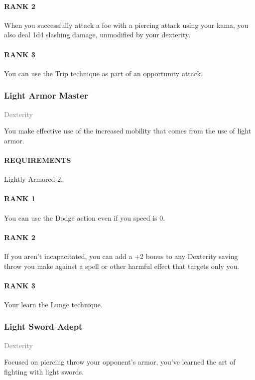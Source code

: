 \paragraph{RANK 2} When you successfully attack a foe with a piercing attack using your kama, you also deal 1d4 slashing damage, unmodified by your dexterity.
\paragraph{RANK 3} You can use the Trip technique as part of an opportunity attack.

\subsubsection{Light Armor Master} \label{feat::lightarmormaster}
\small{\textcolor{gray}{Dexterity}}

\normalsize
You make effective use of the increased mobility that comes from the use of light armor.
\paragraph{REQUIREMENTS} Lightly Armored 2.
\paragraph{RANK 1} You can use the Dodge action even if you speed is 0.
\paragraph{RANK 2} If you aren't incapacitated, you can add a +2 bonus to any Dexterity saving throw you make against a spell or other harmful effect that targets only you.
\paragraph{RANK 3} Your learn the Lunge technique.

\subsubsection{Light Sword Adept} \label{feat::lightswordadept}
\small{\textcolor{gray}{Dexterity}}

\normalsize
Focused on piercing throw your opponent's armor, you've learned the art of fighting with light swords.
